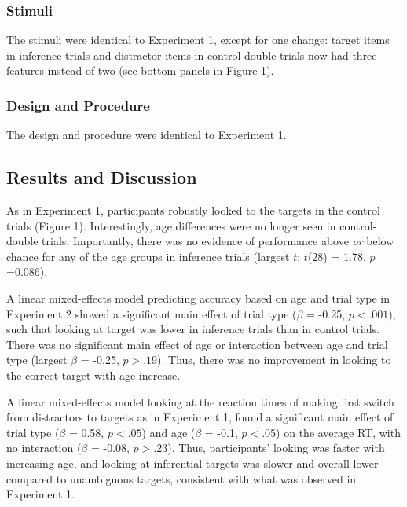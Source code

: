 \documentclass[a4paper,man,apacite,floatsintext]{apa6}
\begin{document}
\subsubsection{Stimuli}\label{stimuli}

The stimuli were identical to Experiment 1, except for one change:
target items in inference trials and distractor items in control-double
trials now had three features instead of two (see bottom panels in
Figure 1).

\subsubsection{Design and Procedure}\label{design-and-procedure}

The design and procedure were identical to Experiment 1.

\subsection{Results and Discussion}\label{results-and-discussion-1}

As in Experiment 1, participants robustly looked to the targets in the
control trials (Figure 1). Interestingly, age differences were no longer
seen in control-double trials. Importantly, there was no evidence of
performance above \emph{or} below chance for any of the age groups in
inference trials (largest \(t\): \(t\)(28) = 1.78, \(p\) =0.086).

A linear mixed-effects model predicting accuracy based on age and trial
type in Experiment 2 showed a significant main effect of trial type
(\(\beta\) = -0.25, \(p <.001\)), such that looking at target was lower
in inference trials than in control trials. There was no significant
main effect of age or interaction between age and trial type (largest
\(\beta\) = -0.25, \(p >.19\)). Thus, there was no improvement in
looking to the correct target with age increase.

A linear mixed-effects model looking at the reaction times of making
first switch from distractors to targets as in Experiment 1, found a
significant main effect of trial type (\(\beta\) = 0.58, \(p <.05\)) and
age (\(\beta\) = -0.1, \(p <.05\)) on the average RT, with no
interaction (\(\beta\) = -0.08, \(p >.23\)). Thus, participants' looking
was faster with increasing age, and looking at inferential targets was
slower and overall lower compared to unambiguous targets, consistent
with what was observed in Experiment 1.
\end{document}
